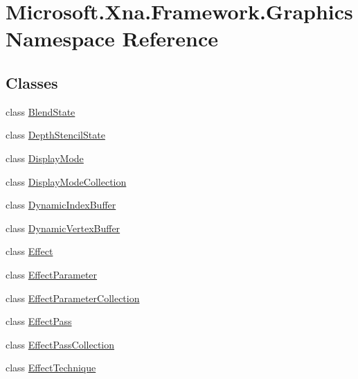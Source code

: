 \hypertarget{namespace_microsoft_1_1_xna_1_1_framework_1_1_graphics}{}\section{Microsoft.\+Xna.\+Framework.\+Graphics Namespace Reference}
\label{namespace_microsoft_1_1_xna_1_1_framework_1_1_graphics}
\subsection*{Classes}
\begin{DoxyCompactItemize}
\item 
class \hyperlink{class_microsoft_1_1_xna_1_1_framework_1_1_graphics_1_1_blend_state}{Blend\+State}
\item 
class \hyperlink{class_microsoft_1_1_xna_1_1_framework_1_1_graphics_1_1_depth_stencil_state}{Depth\+Stencil\+State}
\item 
class \hyperlink{class_microsoft_1_1_xna_1_1_framework_1_1_graphics_1_1_display_mode}{Display\+Mode}
\item 
class \hyperlink{class_microsoft_1_1_xna_1_1_framework_1_1_graphics_1_1_display_mode_collection}{Display\+Mode\+Collection}
\item 
class \hyperlink{class_microsoft_1_1_xna_1_1_framework_1_1_graphics_1_1_dynamic_index_buffer}{Dynamic\+Index\+Buffer}
\item 
class \hyperlink{class_microsoft_1_1_xna_1_1_framework_1_1_graphics_1_1_dynamic_vertex_buffer}{Dynamic\+Vertex\+Buffer}
\item 
class \hyperlink{class_microsoft_1_1_xna_1_1_framework_1_1_graphics_1_1_effect}{Effect}
\item 
class \hyperlink{class_microsoft_1_1_xna_1_1_framework_1_1_graphics_1_1_effect_parameter}{Effect\+Parameter}
\item 
class \hyperlink{class_microsoft_1_1_xna_1_1_framework_1_1_graphics_1_1_effect_parameter_collection}{Effect\+Parameter\+Collection}
\item 
class \hyperlink{class_microsoft_1_1_xna_1_1_framework_1_1_graphics_1_1_effect_pass}{Effect\+Pass}
\item 
class \hyperlink{class_microsoft_1_1_xna_1_1_framework_1_1_graphics_1_1_effect_pass_collection}{Effect\+Pass\+Collection}
\item 
class \hyperlink{class_microsoft_1_1_xna_1_1_framework_1_1_graphics_1_1_effect_technique}{Effect\+Technique}
\item 

\end{DoxyCompactItemize}
